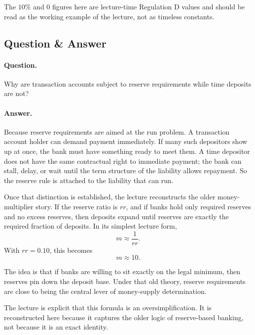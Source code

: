 \begin{remark}
The \(10\%\) and \(0\) figures here are lecture-time Regulation D values and should be read as the working example of the lecture, not as timeless constants.
\end{remark}

\subsection{Question \& Answer}

\paragraph{Question.} Why are transaction accounts subject to reserve requirements while time deposits are not?

\paragraph{Answer.} Because reserve requirements are aimed at the run problem. A transaction account holder can demand payment immediately. If many such depositors show up at once, the bank must have something ready to meet them. A time depositor does not have the same contractual right to immediate payment; the bank can stall, delay, or wait until the term structure of the liability allows repayment. So the reserve rule is attached to the liability that can run.

Once that distinction is established, the lecture reconstructs the older money-multiplier story. If the reserve ratio is \(rr\), and if banks hold only required reserves and no excess reserves, then deposits expand until reserves are exactly the required fraction of deposits. In its simplest lecture form,
\begin{equation}
m \approx \frac{1}{rr}.
\end{equation}
With \(rr = 0.10\), this becomes
\begin{equation}
m \approx 10.
\end{equation}

The idea is that if banks are willing to sit exactly on the legal minimum, then reserves pin down the deposit base. Under that old theory, reserve requirements are close to being the central lever of money-supply determination.

\begin{remark}
The lecture is explicit that this formula is an oversimplification. It is reconstructed here because it captures the older logic of reserve-based banking, not because it is an exact identity.
\end{remark}

